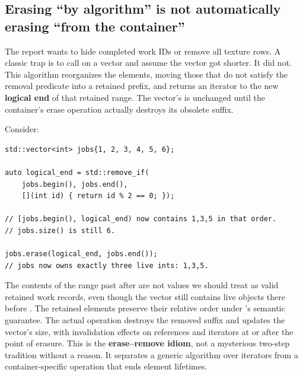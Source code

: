 \subsection{Erasing ``by algorithm'' is not automatically erasing ``from the container''}\label{01-foundations-i-ch006-erasing-by-algorithm-is-not-automatically-erasing-from-the-container}

\hypertarget{01-foundations-i-ch006-erasing-by-algorithm-is-not-automatically-erasing-from-the-container}{}

The report wants to hide completed work IDs or remove all texture rows. A classic trap is to call  on a vector and assume the vector got shorter. It did not. This algorithm reorganizes the elements, moving those that do not satisfy the removal predicate into a retained prefix, and returns an iterator to the new \textbf{logical end} of that retained range. The vector's  is unchanged until the container's erase operation actually destroys its obsolete suffix.

Consider:

\begin{verbatim}
std::vector<int> jobs{1, 2, 3, 4, 5, 6};

auto logical_end = std::remove_if(
    jobs.begin(), jobs.end(),
    [](int id) { return id % 2 == 0; });

// [jobs.begin(), logical_end) now contains 1,3,5 in that order.
// jobs.size() is still 6.

jobs.erase(logical_end, jobs.end());
// jobs now owns exactly three live ints: 1,3,5.
\end{verbatim}

The contents of the range past  after  are not values we should treat as valid retained work records, even though the vector still contains live objects there before . The retained elements preserve their relative order under 's semantic guarantee. The actual  operation destroys the removed suffix and updates the vector's size, with invalidation effects on references and iterators at or after the point of erasure. This is the \textbf{erase--remove idiom}, not a mysterious two-step tradition without a reason. It separates a generic algorithm over iterators from a container-specific operation that ends element lifetimes.

